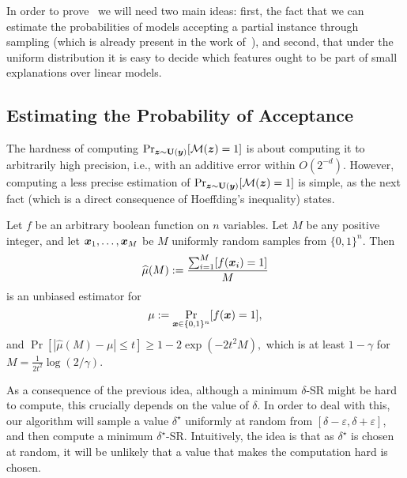

In order to prove~ we will need two main ideas: first, the fact that we can estimate the probabilities of models accepting a partial instance through sampling (which is already present in the work of~\citet{izza2024locallyminimalprobabilisticexplanations}), and second, that under the uniform distribution it is easy to decide which features ought to be part of small explanations over linear models.

\subsection{Estimating the Probability of Acceptance}
 The  hardness of computing
$\Pr_{{\bm{z}}  \sim \mathbf{U}({\bm{y}})}[\mathcal{M}({\bm{z}}) = 1]$ is about computing it to arbitrarily high precision, i.e., with an additive error within $O(2^{-d})$. However, computing a less precise estimation of $\Pr_{{\bm{z}} \sim \mathbf{U}({\bm{y}})}[\mathcal{M}({\bm{z}}) = 1]$ is simple, as the next fact (which is a direct consequence of Hoeffding's inequality)  states.

\begin{fact}\label{fact:hoeffding}
    Let $f$ be an arbitrary boolean function on $n$ variables. Let $M$ be any positive integer,
    and let ${\bm{x}}_1, \ldots, {\bm{x}}_M$ be $M$ uniformly random samples from $\{0, 1\}^n$. Then 
    \[
        \widehat{\mu}(M) := \frac{\sum_{i=1}^M [f({\bm{x}}_i) = 1]}{M}
    \]
    is an unbiased estimator for 
    \[
        \mu := \Pr_{{\bm{x}} \in \{0, 1\}^n}[f({\bm{x}}) = 1],
    \]
    and 
    \(
    \Pr[\left|\widehat{\mu}(M) - \mu \right| \leq t] \geq 1 - 2\exp(-2t^2 M),
    \)
    which is at least $1 - \gamma$ for $M = \frac{1}{2t^2} \log(2/\gamma)$.
\end{fact}

As a consequence of the previous idea, although a minimum $\delta$-SR might be hard to compute, this crucially depends on the value of $\delta$. In order to deal with this, our algorithm will sample a value $\delta^\star$ uniformly at random from $[\delta-\varepsilon, \delta+\varepsilon]$, and then compute a minimum $\delta^\star$-SR. Intuitively, the idea is that as $\delta^\star$ is chosen at random, it will be unlikely that a value that makes the computation hard is chosen. 

